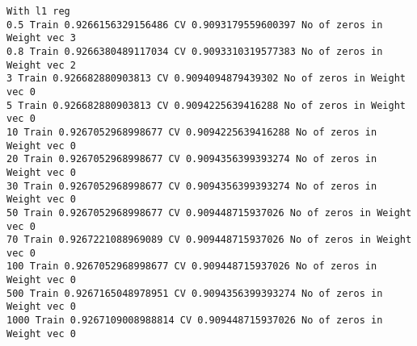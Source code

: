 \documentclass[11pt]{article}
\begin{document}
    \begin{Verbatim}[commandchars=\\\{\}]
With l1 reg
0.5 Train 0.9266156329156486 CV 0.9093179559600397 No of zeros in Weight vec 3
0.8 Train 0.9266380489117034 CV 0.9093310319577383 No of zeros in Weight vec 2
3 Train 0.926682880903813 CV 0.9094094879439302 No of zeros in Weight vec 0
5 Train 0.926682880903813 CV 0.9094225639416288 No of zeros in Weight vec 0
10 Train 0.9267052968998677 CV 0.9094225639416288 No of zeros in Weight vec 0
20 Train 0.9267052968998677 CV 0.9094356399393274 No of zeros in Weight vec 0
30 Train 0.9267052968998677 CV 0.9094356399393274 No of zeros in Weight vec 0
50 Train 0.9267052968998677 CV 0.909448715937026 No of zeros in Weight vec 0
70 Train 0.9267221088969089 CV 0.909448715937026 No of zeros in Weight vec 0
100 Train 0.9267052968998677 CV 0.909448715937026 No of zeros in Weight vec 0
500 Train 0.9267165048978951 CV 0.9094356399393274 No of zeros in Weight vec 0
1000 Train 0.9267109008988814 CV 0.909448715937026 No of zeros in Weight vec 0

    \end{Verbatim}
\end{document}
